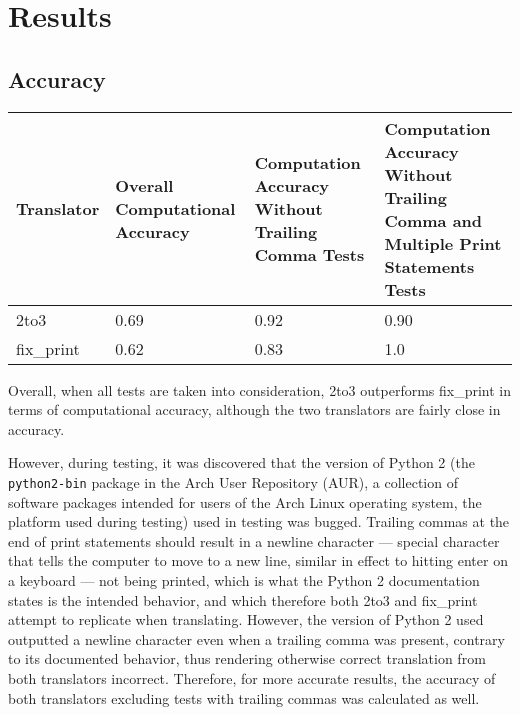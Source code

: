 \section{Results}

\subsection{Accuracy}
\begin{table*}[ht]
    \begin{tabular}{@{}l|lll@{}}
    \toprule
    Translator & Overall Computational Accuracy & Computation Accuracy Without Trailing Comma Tests & Computation Accuracy Without Trailing Comma and Multiple Print Statements Tests \\ \midrule
    2to3       & 0.69                         & 0.92                                      & 0.90                                                                             \\
    fix\_print & 0.62                          & 0.83                                      & 1.0                                                                               \\ \bottomrule
    \end{tabular}
\end{table*}

Overall, when all tests are taken into consideration, 2to3 outperforms fix\_print in terms of computational accuracy, although the two translators are fairly close in accuracy.

However, during testing, it was discovered that the version of Python 2 (the \verb|python2-bin| package in the Arch User Repository (AUR), a collection of software packages intended for users of the Arch Linux operating system, the platform used during testing) used in testing was bugged. Trailing commas at the end of print statements should result in a newline character --- special character that tells the computer to move to a new line, similar in effect to hitting enter on a keyboard --- not being printed, which is what the Python 2 documentation states is the intended behavior, and which therefore both 2to3 and fix\_print attempt to replicate when translating. However, the version of Python 2 used outputted a newline character even when a trailing comma was present, contrary to its documented behavior, thus rendering otherwise correct translation from both translators incorrect. Therefore, for more accurate results, the accuracy of both translators excluding tests with trailing commas was calculated as well.


